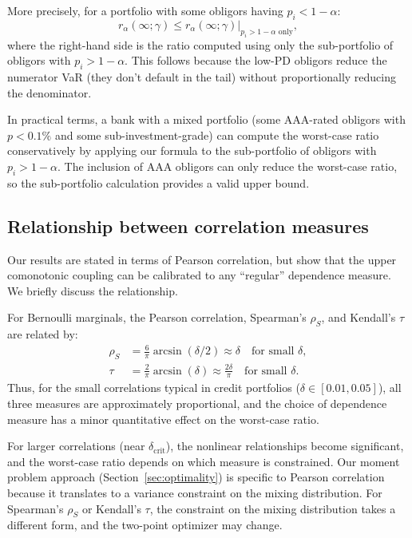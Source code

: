 \documentclass[11pt]{article}
\theoremstyle{definition}
\newcommand{\1}{\mathbf{1}}
\begin{document}
More precisely, for a portfolio with some obligors having $p_i < 1 - \alpha$:
\[
  r_\alpha(\infty; \gamma) \leq r_\alpha(\infty; \gamma)\big|_{p_i > 1-\alpha \text{ only}},
\]
where the right-hand side is the ratio computed using only the sub-portfolio of obligors with $p_i > 1 - \alpha$. This follows because the low-PD obligors reduce the numerator VaR (they don't default in the tail) without proportionally reducing the denominator.

In practical terms, a bank with a mixed portfolio (some AAA-rated obligors with $p < 0.1\%$ and some sub-investment-grade) can compute the worst-case ratio conservatively by applying our formula to the sub-portfolio of obligors with $p_i > 1 - \alpha$. The inclusion of AAA obligors can only reduce the worst-case ratio, so the sub-portfolio calculation provides a valid upper bound.

\subsection{Relationship between correlation measures}\label{app:correlation}

Our results are stated in terms of Pearson correlation, but \citet{DVNSupper} show that the upper comonotonic coupling can be calibrated to any ``regular'' dependence measure. We briefly discuss the relationship.

For Bernoulli marginals, the Pearson correlation, Spearman's $\rho_S$, and Kendall's $\tau$ are related by:
\begin{align*}
  \rho_S &= \frac{6}{\pi}\arcsin(\delta/2) \approx \delta \quad\text{for small } \delta, \\
  \tau &= \frac{2}{\pi}\arcsin(\delta) \approx \frac{2\delta}{\pi} \quad\text{for small } \delta.
\end{align*}
Thus, for the small correlations typical in credit portfolios ($\delta \in [0.01, 0.05]$), all three measures are approximately proportional, and the choice of dependence measure has a minor quantitative effect on the worst-case ratio.

For larger correlations (near $\delta_{\mathrm{crit}}$), the nonlinear relationships become significant, and the worst-case ratio depends on which measure is constrained. Our moment problem approach (Section~\ref{sec:optimality}) is specific to Pearson correlation because it translates to a variance constraint on the mixing distribution. For Spearman's $\rho_S$ or Kendall's $\tau$, the constraint on the mixing distribution takes a different form, and the two-point optimizer may change.
\end{document}
